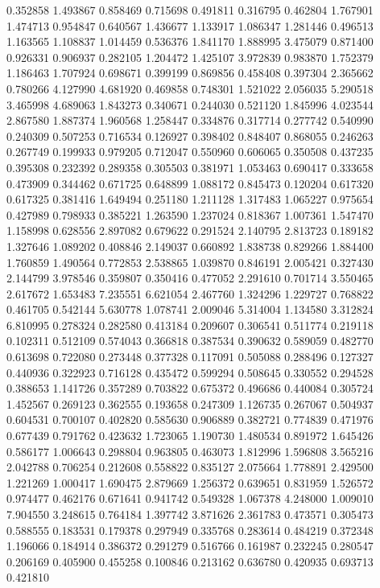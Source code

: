 0.352858
1.493867
0.858469
0.715698
0.491811
0.316795
0.462804
1.767901
1.474713
0.954847
0.640567
1.436677
1.133917
1.086347
1.281446
0.496513
1.163565
1.108837
1.014459
0.536376
1.841170
1.888995
3.475079
0.871400
0.926331
0.906937
0.282105
1.204472
1.425107
3.972839
0.983870
1.752379
1.186463
1.707924
0.698671
0.399199
0.869856
0.458408
0.397304
2.365662
0.780266
4.127990
4.681920
0.469858
0.748301
1.521022
2.056035
5.290518
3.465998
4.689063
1.843273
0.340671
0.244030
0.521120
1.845996
4.023544
2.867580
1.887374
1.960568
1.258447
0.334876
0.317714
0.277742
0.540990
0.240309
0.507253
0.716534
0.126927
0.398402
0.848407
0.868055
0.246263
0.267749
0.199933
0.979205
0.712047
0.550960
0.606065
0.350508
0.437235
0.395308
0.232392
0.289358
0.305503
0.381971
1.053463
0.690417
0.333658
0.473909
0.344462
0.671725
0.648899
1.088172
0.845473
0.120204
0.617320
0.617325
0.381416
1.649494
0.251180
1.211128
1.317483
1.065227
0.975654
0.427989
0.798933
0.385221
1.263590
1.237024
0.818367
1.007361
1.547470
1.158998
0.628556
2.897082
0.679622
0.291524
2.140795
2.813723
0.189182
1.327646
1.089202
0.408846
2.149037
0.660892
1.838738
0.829266
1.884400
1.760859
1.490564
0.772853
2.538865
1.039870
0.846191
2.005421
0.327430
2.144799
3.978546
0.359807
0.350416
0.477052
2.291610
0.701714
3.550465
2.617672
1.653483
7.235551
6.621054
2.467760
1.324296
1.229727
0.768822
0.461705
0.542144
5.630778
1.078741
2.009046
5.314004
1.134580
3.312824
6.810995
0.278324
0.282580
0.413184
0.209607
0.306541
0.511774
0.219118
0.102311
0.512109
0.574043
0.366818
0.387534
0.390632
0.589059
0.482770
0.613698
0.722080
0.273448
0.377328
0.117091
0.505088
0.288496
0.127327
0.440936
0.322923
0.716128
0.435472
0.599294
0.508645
0.330552
0.294528
0.388653
1.141726
0.357289
0.703822
0.675372
0.496686
0.440084
0.305724
1.452567
0.269123
0.362555
0.193658
0.247309
1.126735
0.267067
0.504937
0.604531
0.700107
0.402820
0.585630
0.906889
0.382721
0.774839
0.471976
0.677439
0.791762
0.423632
1.723065
1.190730
1.480534
0.891972
1.645426
0.586177
1.006643
0.298804
0.963805
0.463073
1.812996
1.596808
3.565216
2.042788
0.706254
0.212608
0.558822
0.835127
2.075664
1.778891
2.429500
1.221269
1.000417
1.690475
2.879669
1.256372
0.639651
0.831959
1.526572
0.974477
0.462176
0.671641
0.941742
0.549328
1.067378
4.248000
1.009010
7.904550
3.248615
0.764184
1.397742
3.871626
2.361783
0.473571
0.305473
0.588555
0.183531
0.179378
0.297949
0.335768
0.283614
0.484219
0.372348
1.196066
0.184914
0.386372
0.291279
0.516766
0.161987
0.232245
0.280547
0.206169
0.405900
0.455258
0.100846
0.213162
0.636780
0.420935
0.693713
0.421810
